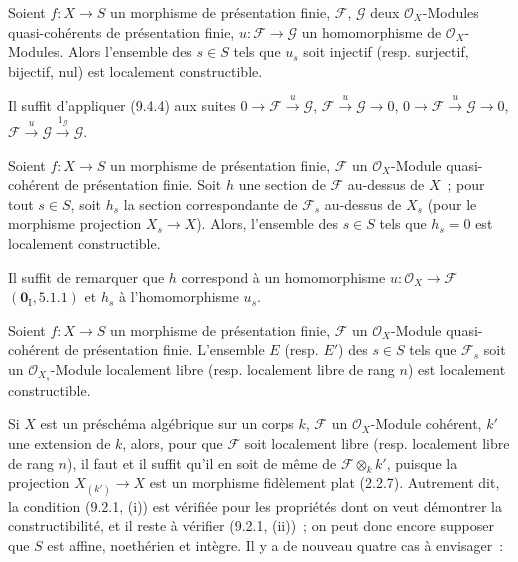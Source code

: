 
\begin{corollary}[9.4.5]
\label{IV.9.4.5-fr}
Soient $f:X\to S$ un morphisme de présentation finie, $\mathcal F$,
$\mathcal G$ deux $\mathcal O_X$-Modules quasi-cohérents de présentation finie,
$u:\mathcal F\to\mathcal G$ un homomorphisme de $\mathcal O_X$-Modules.
Alors l'ensemble des $s\in S$ tels que $u_s$ soit injectif
\textnormal{(}resp. surjectif, bijectif, nul\textnormal{)} est localement
constructible.
\end{corollary}

Il suffit d'appliquer (9.4.4) aux suites
$0\to\mathcal F\xrightarrow{u}\mathcal G$,
$\mathcal F\xrightarrow{u}\mathcal G\to0$,
$0\to\mathcal F\xrightarrow{u}\mathcal G\to0$,
$\mathcal F\xrightarrow{u}\mathcal G\xrightarrow{1_\mathcal G}\mathcal G$.

\begin{corollary}[9.4.6]
\label{IV.9.4.6-fr}
Soient $f:X\to S$ un morphisme de présentation finie, $\mathcal F$ un
$\mathcal O_X$-Module quasi-cohérent de présentation finie. Soit $h$ une
section de $\mathcal F$ au-dessus de $X$~; pour tout $s\in S$, soit $h_s$ la
section correspondante de $\mathcal F_s$ au-dessus de $X_s$ \textnormal{(}pour
le morphisme projection $X_s\to X$\textnormal{)}. Alors, l'ensemble des
$s\in S$ tels que $h_s=0$ est localement constructible.
\end{corollary}

Il suffit de remarquer que $h$ correspond à un homomorphisme
$u:\mathcal O_X\to\mathcal F$ $(\mathbf 0_{\mathrm I},5.1.1)$ et $h_s$ à
l'homomorphisme $u_s$.

\begin{proposition}[9.4.7]
\label{IV.9.4.7-fr}
Soient $f:X\to S$ un morphisme de présentation finie, $\mathcal F$ un
$\mathcal O_X$-Module quasi-cohérent de présentation finie. L'ensemble $E$
\textnormal{(}resp. $E'$\textnormal{)} des $s\in S$ tels que $\mathcal F_s$
soit un $\mathcal O_{X_s}$-Module localement libre \textnormal{(}resp.
localement libre de rang $n$\textnormal{)} est localement constructible.
\end{proposition}

Si $X$ est un préschéma algébrique sur un corps $k$, $\mathcal F$ un
$\mathcal O_X$-Module cohérent, $k'$ une extension de $k$, alors, pour que
$\mathcal F$ soit localement libre (resp. localement libre de rang $n$), il
faut et il suffit qu'il en soit de même de $\mathcal F\otimes_k k'$, puisque la
projection $X_{(k')}\to X$ est un morphisme fidèlement plat (2.2.7). Autrement
dit, la condition (9.2.1, (i)) est vérifiée pour les propriétés dont on veut
démontrer la constructibilité, et il reste à vérifier (9.2.1, (ii))~; on peut
donc encore supposer que $S$ est affine, noethérien et intègre. Il y a de
nouveau quatre cas à envisager~:

